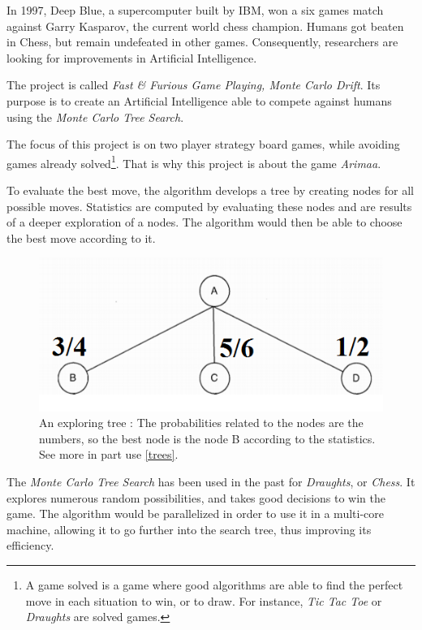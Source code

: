 
In 1997, Deep Blue, a supercomputer built by IBM, won a six games match against Garry Kasparov, the current world chess champion. Humans got beaten in Chess, but remain undefeated in other games. Consequently, researchers are looking for improvements in Artificial Intelligence.
\newline

The project is called \emph{Fast \& Furious Game Playing, Monte Carlo Drift}. Its purpose is to create an Artificial Intelligence able to compete against humans using the \emph{Monte Carlo Tree Search}.
\newline

The focus of this project is on two player strategy board games, while avoiding games already solved\footnote{A game solved is a game where good algorithms are able to find the perfect move in each situation to win, or to draw. For instance, \textit{Tic Tac Toe} or \textit{Draughts} are solved games.}. That is why this project is about the game \emph{Arimaa}.
\newline

To evaluate the best move, the algorithm develops a tree by creating nodes for all possible moves. Statistics are computed by evaluating these nodes and are results of a deeper exploration of a nodes. The algorithm would then be able to choose the best move according to it.
\smallbreak
\begin{figure}[!h] 
\centerline{\includegraphics[scale=0.75]{1_Presentation/1.1_Our_project_Dan/tree}}
  \caption{An exploring tree : \newline The probabilities related to the nodes are the numbers, so the best node is the node B according to the statistics. See more in part  use \ref{trees}.} %
  \centering
\end{figure}
The \emph{Monte Carlo Tree Search} has been used in the past for \textit{Draughts}, or \textit{Chess}. It explores numerous random possibilities, and takes good decisions to win the game.
The algorithm would be parallelized in order to use it in a multi-core machine, allowing it to go further into the search tree, thus improving its efficiency.
\newline

